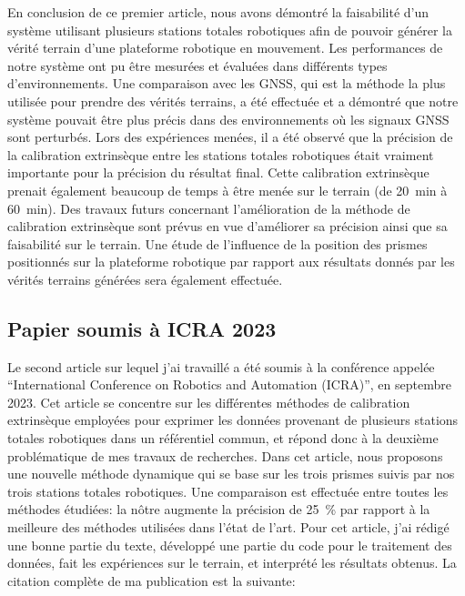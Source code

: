 En conclusion de ce premier article, nous avons démontré la faisabilité d'un système utilisant plusieurs stations totales robotiques afin de pouvoir générer la vérité terrain d'une plateforme robotique en mouvement.
Les performances de notre système ont pu être mesurées et évaluées dans différents types d'environnements.
Une comparaison avec les \ac{GNSS}, qui est la méthode la plus utilisée pour prendre des vérités terrains, a été effectuée et a démontré que notre système pouvait être plus précis dans des environnements où les signaux \ac{GNSS} sont perturbés.
Lors des expériences menées, il a été observé que la précision de la calibration extrinsèque entre les stations totales robotiques était vraiment importante pour la précision du résultat final.
Cette calibration extrinsèque prenait également beaucoup de temps à être menée sur le terrain (de \SI{20}{min} à \SI{60}{min}).
Des travaux futurs concernant l'amélioration de la méthode de calibration extrinsèque sont prévus en vue d'améliorer sa précision ainsi que sa faisabilité sur le terrain.
Une étude de l'influence de la position des prismes positionnés sur la plateforme robotique par rapport aux résultats donnés par les vérités terrains générées sera également effectuée.

\subsection{Papier soumis à ICRA 2023}

Le second article sur lequel j'ai travaillé a été soumis à la conférence appelée ``International Conference on Robotics and Automation (ICRA)'', en septembre 2023.
Cet article se concentre sur les différentes méthodes de calibration extrinsèque employées pour exprimer les données provenant de plusieurs stations totales robotiques dans un référentiel commun, et répond donc à la deuxième problématique de mes travaux de recherches.
Dans cet article, nous proposons une nouvelle méthode dynamique qui se base sur les trois prismes suivis par nos trois stations totales robotiques.
Une comparaison est effectuée entre toutes les méthodes étudiées: la nôtre augmente la précision de \SI{25}{\%} par rapport à la meilleure des méthodes utilisées dans l'état de l'art.
Pour cet article, j'ai rédigé une bonne partie du texte, développé une partie du code pour le traitement des données, fait les expériences sur le terrain, et interprété les résultats obtenus.
La citation complète de ma publication est la suivante:

\begin{center}
    \textbf{}
\end{center}

